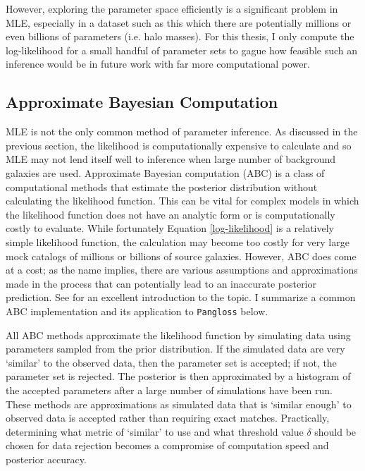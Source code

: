 \documentclass[%
 reprint,
 amsmath,amssymb,
 aps,nofootinbib
]{revtex4-1}
\begin{document}
However, exploring the parameter space efficiently is a significant problem in MLE, especially in a dataset such as this which there are potentially millions or even billions of parameters (i.e. halo masses). For this thesis, I only compute the log-likelihood for a small handful of parameter sets to gague how feasible such an inference would be in future work with far more computational power.

\subsection{Approximate Bayesian Computation} \label{abc}

MLE is not the only common method of parameter inference. As discussed in the previous section, the likelihood is computationally expensive to calculate and so MLE may not lend itself well to inference when large number of background galaxies are used. Approximate Bayesian computation (ABC) is a class of computational methods that estimate the posterior distribution without calculating the likelihood function. This can be vital for complex models in which the likelihood function does not have an analytic form or is computationally costly to evaluate. While fortunately Equation \eqref{log-likelihood} is a relatively simple likelihood function, the calculation may become too costly for very large mock catalogs of millions or billions of source galaxies. However, ABC does come at a cost; as the name implies, there are various assumptions and approximations made in the process that can potentially lead to an inaccurate posterior prediction. See \cite{abc} for an excellent introduction to the topic. I summarize a common ABC implementation and its application to \texttt{Pangloss} below.

All ABC methods approximate the likelihood function by simulating data using parameters sampled from the prior distribution. If the simulated data are very `similar' to the observed data, then the parameter set is accepted; if not, the parameter set is rejected. The posterior is then approximated by a histogram of the accepted parameters after a large number of simulations have been run. These methods are approximations as simulated data that is `similar enough' to observed data is accepted rather than requiring exact matches. Practically, determining what metric of `similar' to use and what threshold value $\delta$ should be chosen for data rejection becomes a compromise of computation speed and posterior accuracy.
\end{document}
